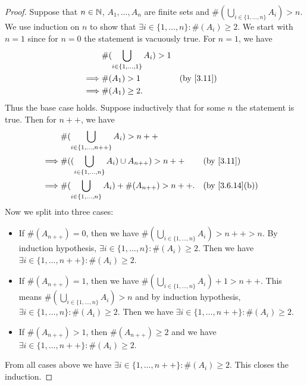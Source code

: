 \begin{proof}
  Suppose that \(n \in \mathbb{N}\), \(A_1, \dots, A_n\) are finite sets and \(\#(\bigcup_{i \in \{1, \dots, n\}} A_i) > n\).
  We use induction on \(n\) to show that \(\exists i \in \{1, \dots, n\} : \#(A_i) \geq 2\).
  We start with \(n = 1\) since for \(n = 0\) the statement is vacuously true.
  For \(n = 1\), we have
  \begin{align*}
             & \#(\bigcup_{i \in \{1, \dots, 1\}} A_i) > 1                              \\
    \implies & \#(A_1) > 1                                 &  & \text{(by \cref{3.11})} \\
    \implies & \#(A_1) \geq 2.
  \end{align*}
  Thus the base case holds.
  Suppose inductively that for some \(n\) the statement is true.
  Then for \(n++\), we have
  \begin{align*}
             & \#(\bigcup_{i \in \{1, \dots, n++\}} A_i) > n++                                                \\
    \implies & \#((\bigcup_{i \in \{1, \dots, n\}} A_i) \cup A_{n++}) > n++ &  & \text{(by \cref{3.11})}      \\
    \implies & \#(\bigcup_{i \in \{1, \dots, n\}} A_i) + \#(A_{n++}) > n++. &  & \text{(by \cref{3.6.14}(b))}
  \end{align*}
  Now we split into three cases:
  \begin{itemize}
    \item If \(\#(A_{n++}) = 0\), then we have \(\#(\bigcup_{i \in \{1, \dots, n\}} A_i) > n++ > n\).
          By induction hypothesis, \(\exists i \in \{1, \dots, n\} : \#(A_i) \geq 2\).
          Then we have \(\exists i \in \{1, \dots, n++\} : \#(A_i) \geq 2\).
    \item If \(\#(A_{n++}) = 1\), then we have \(\#(\bigcup_{i \in \{1, \dots, n\}} A_i) + 1 > n++\).
          This means \(\#(\bigcup_{i \in \{1, \dots, n\}} A_i) > n\) and by induction hypothesis, \(\exists i \in \{1, \dots, n\} : \#(A_i) \geq 2\).
          Then we have \(\exists i \in \{1, \dots, n++\} : \#(A_i) \geq 2\).
    \item If \(\#(A_{n++}) > 1\), then \(\#(A_{n++}) \geq 2\) and we have \(\exists i \in \{1, \dots, n++\} : \#(A_i) \geq 2\).
  \end{itemize}
  From all cases above we have \(\exists i \in \{1, \dots, n++\} : \#(A_i) \geq 2\).
  This closes the induction.
\end{proof}
